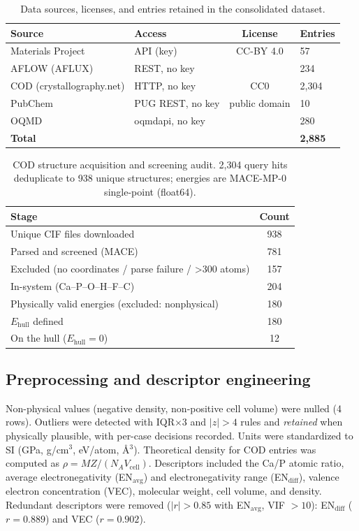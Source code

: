 \documentclass[review,11pt,a4paper]{elsarticle}
\begin{document}
\begin{table}[ht]
\centering\small
\caption{Data sources, licenses, and entries retained in the consolidated dataset.}
\label{tab:sumber}
\begin{tabular}{llcl}
\toprule
Source & Access & License & Entries \\
\midrule
Materials Project & API (key) & CC-BY 4.0 & 57 \\
AFLOW (AFLUX) & REST, no key & \cite{curtarolo2012} & 234 \\
COD (crystallography.net) & HTTP, no key & CC0 & 2{,}304 \\
PubChem & PUG REST, no key & public domain & 10 \\
OQMD & oqmdapi, no key & \cite{kirklin2015} & 280 \\
\midrule
\textbf{Total} & & & \textbf{2{,}885} \\
\bottomrule
\end{tabular}
\end{table}

\begin{table}[ht]
\centering\small
\caption{COD structure acquisition and screening audit. 2{,}304 query hits deduplicate to 938 unique structures; energies are MACE-MP-0 single-point (float64).}
\label{tab:cod_qc}
\begin{tabular}{lc}
\toprule
Stage & Count \\
\midrule
Unique CIF files downloaded & 938 \\
Parsed and screened (MACE) & 781 \\
Excluded (no coordinates / parse failure / >300 atoms) & 157 \\
In-system (Ca--P--O--H--F--C) & 204 \\
Physically valid energies (excluded: nonphysical) & 180 \\
$E_\mathrm{hull}$ defined & 180 \\
On the hull ($E_\mathrm{hull} = 0$) & 12 \\
\bottomrule
\end{tabular}
\end{table}

\subsection{Preprocessing and descriptor engineering}
Non-physical values (negative density, non-positive cell volume) were nulled (4 rows). Outliers were detected with IQR$\times$3 and $|z|>4$ rules and \emph{retained} when physically plausible, with per-case decisions recorded. Units were standardized to SI (GPa, g/cm$^3$, eV/atom, \AA$^3$). Theoretical density for COD entries was computed as $\rho = MZ/(N_A V_\mathrm{cell})$. Descriptors included the Ca/P atomic ratio, average electronegativity (EN$_\mathrm{avg}$) and electronegativity range (EN$_\mathrm{diff}$), valence electron concentration (VEC), molecular weight, cell volume, and density. Redundant descriptors were removed ($|r| > 0.85$ with EN$_\mathrm{avg}$, VIF $> 10$): EN$_\mathrm{diff}$ ($r=0.889$) and VEC ($r=0.902$).
\end{document}
